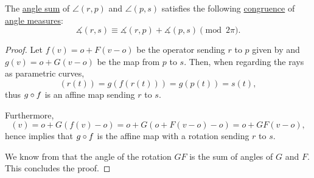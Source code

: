 \begin{proposition}\label{thm:sum_of_angles_measure}
  The \hyperref[def:sum_of_angles]{angle sum} of \( \angle(r, p) \) and \( \angle(p, s) \) satisfies the following \hyperref[rem:congruence_modulo_real_number]{congruence} of \hyperref[def:angle/measure]{angle measures}:
  \begin{equation*}
    \measuredangle(r, s) \equiv \measuredangle(r, p) + \measuredangle(p, s) \pmod {2\pi}.
  \end{equation*}
\end{proposition}
\begin{proof}
  Let \( f(v) = o + F(v - o) \) be the operator sending \( r \) to \( p \) given by  and \( g(v) = o + G(v - o) \) be the map from \( p \) to \( s \). Then, when regarding the rays as parametric curves,
  \begin{equation*}
    [g \bincirc f](r(t)) = g(f(r(t))) = g(p(t)) = s(t),
  \end{equation*}
  thus \( g \bincirc f \) is an affine map sending \( r \) to \( s \).

  Furthermore,
  \begin{equation*}
    [g \bincirc f](v)
    =
    o + G(f(v) - o)
    =
    o + G(o + F(v - o) - o)
    =
    o + GF(v - o),
  \end{equation*}
  hence  implies that \( g \bincirc f \) is the  affine map with a rotation sending \( r \) to \( s \).

  We know from  that the angle of the rotation \( GF \) is the sum of angles of \( G \) and \( F \). This concludes the proof.
\end{proof}

